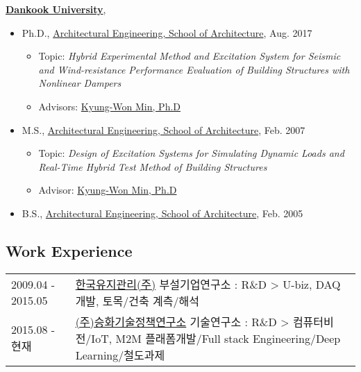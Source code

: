 \href{http://www.dankook.ac.kr/}{\textbf{Dankook University}},
\begin{itemize}
\item[] Ph.D.,
        \href{http://cms.dankook.ac.kr/web/archi}
             {Architectural Engineering, School of Architecture},
             Aug. 2017
        \begin{itemize}
        \item Topic: \emph{Hybrid Experimental Method and Excitation System for Seismic and Wind-resistance Performance Evaluation of Building Structures with Nonlinear Dampers}
        \item Advisors:
              \href{http://cms.dankook.ac.kr/web/archi/-16?p_p_id=DeptInfo_WAR_empInfoportlet&p_p_lifecycle=0&p_p_state=normal&p_p_mode=view&p_p_col_id=column-2&p_p_col_count=1&_DeptInfo_WAR_empInfoportlet_empId=2zEyEnhbhLlys2HRljBFWg%3D%3D&_DeptInfo_WAR_empInfoportlet_action=view_message}
                   {Kyung-Won Min, Ph.D}
        \end{itemize}

\item[] M.S.,
        \href{http://cms.dankook.ac.kr/web/archi}
             {Architectural Engineering, School of Architecture},
             Feb. 2007
        \begin{itemize}
        \item Topic: \emph{Design of Excitation Systems for Simulating Dynamic Loads and Real-Time Hybrid Test Method of Building Structures}
        \item Advisor:
              \href{http://cms.dankook.ac.kr/web/archi/-16?p_p_id=DeptInfo_WAR_empInfoportlet&p_p_lifecycle=0&p_p_state=normal&p_p_mode=view&p_p_col_id=column-2&p_p_col_count=1&_DeptInfo_WAR_empInfoportlet_empId=2zEyEnhbhLlys2HRljBFWg%3D%3D&_DeptInfo_WAR_empInfoportlet_action=view_message}
                   {Kyung-Won Min, Ph.D}
        \end{itemize}
\item[] B.S.,
        \href{http://cms.dankook.ac.kr/web/archi}
             {Architectural Engineering, School of Architecture},
             Feb. 2005
\end{itemize}

\subsection*{Work Experience}

\begin{tabularx}{\textwidth}{@{}p{}X@{}}
2009.04 - 2015.05 & \href{http://www.kmbest.co.kr/}{한국유지관리(주)} 
부설기업연구소 : R\&D \textgreater{} U-biz, DAQ개발, 토목/건축
계측/해석\\
2015.08 - 현재 & \href{http://www.shtpi.co.kr/}{(주)승화기술정책연구소}
 기술연구소 : R\&D \textgreater{} 컴퓨터비전/IoT, M2M 플래폼개발/Full stack Engineering/Deep Learning/철도과제\\
\end{tabularx}


